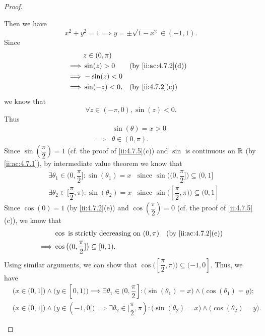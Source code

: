\begin{proof}
\begin{itemize}
          Then we have
          \[
            x^2 + y^2 = 1 \implies y = \pm \sqrt{1 - x^2} \in (-1, 1).
          \]
          Since
          \begin{align*}
                     & z \in (0, \pi)                          \\
            \implies & \sin(z) > 0    &  & \by{ii:ac:4.7.2}[d] \\
            \implies & -\sin(z) < 0                            \\
            \implies & \sin(-z) < 0,  &  & \by{ii:4.7.2}[c]
          \end{align*}
          we know that
          \[
            \forall z \in (-\pi, 0), \sin(z) < 0.
          \]
          Thus
          \begin{align*}
                     & \sin(\theta) = x > 0 \\
            \implies & \theta \in (0, \pi).
          \end{align*}
          Since \(\sin(\dfrac{\pi}{2}) = 1\) (cf. the proof of \cref{ii:4.7.5}(c)) and \(\sin\) is continuous on \(\mathbb{R}\) (by \cref{ii:ac:4.7.1}), by intermediate value theorem we know that
          \begin{align*}
             & \exists \theta_1 \in (0, \dfrac{\pi}{2}] : \sin(\theta_1) = x   & \text{since } \sin\big((0, \dfrac{\pi}{2}]\big) \subseteq (0, 1]   \\
             & \exists \theta_2 \in [\dfrac{\pi}{2}, \pi) : \sin(\theta_2) = x & \text{since } \sin\big([\dfrac{\pi}{2}, \pi)\big) \subseteq (0, 1]
          \end{align*}
          Since \(\cos(0) = 1\) (by \cref{ii:4.7.2}(e)) and \(\cos(\dfrac{\pi}{2}) = 0\) (cf. the proof of \cref{ii:4.7.5}(c)), we know that
          \begin{align*}
                     & \cos \text{ is strictly decreasing on } (0, \pi)    &  & \by{ii:ac:4.7.2}[e] \\
            \implies & \cos\big((0, \dfrac{\pi}{2}]\big) \subseteq [0, 1).
          \end{align*}
          Using similar arguments, we can show that \(\cos\big([\dfrac{\pi}{2}, \pi)\big) \subseteq (-1, 0]\).
          Thus, we have
          \begin{align*}
             & \big(x \in (0, 1]\big) \land \big(y \in [0, 1)\big) \implies \exists \theta_1 \in (0, \dfrac{\pi}{2}] : \big(\sin(\theta_1) = x\big) \land \big(\cos(\theta_1) = y\big);    \\
             & \big(x \in (0, 1]\big) \land \big(y \in (-1, 0]\big) \implies \exists \theta_2 \in [\dfrac{\pi}{2}, \pi) : \big(\sin(\theta_2) = x\big) \land \big(\cos(\theta_2) = y\big).

\end{align*}
\end{itemize}
\end{proof}
